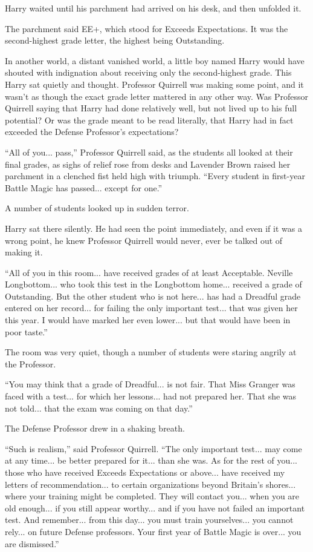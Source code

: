 Harry waited until his parchment had arrived on his desk, and then unfolded it.

The parchment said EE+, which stood for Exceeds Expectations. It was the second-highest grade letter, the highest being Outstanding.

In another world, a distant vanished world, a little boy named Harry would have shouted with indignation about receiving only the second-highest grade. This Harry sat quietly and thought. Professor Quirrell was making some point, and it wasn't as though the exact grade letter mattered in any other way. Was Professor Quirrell saying that Harry had done relatively well, but not lived up to his full potential? Or was the grade meant to be read literally, that Harry had in fact exceeded the Defense Professor's expectations?

``All of you... pass,'' Professor Quirrell said, as the students all looked at their final grades, as sighs of relief rose from desks and Lavender Brown raised her parchment in a clenched fist held high with triumph. ``Every student in first-year Battle Magic has passed... except for one.''

A number of students looked up in sudden terror.

Harry sat there silently. He had seen the point immediately, and even if it was a wrong point, he knew Professor Quirrell would never, ever be talked out of making it.

``All of you in this room... have received grades of at least Acceptable. Neville Longbottom... who took this test in the Longbottom home... received a grade of Outstanding. But the other student who is not here... has had a Dreadful grade entered on her record... for failing the only important test... that was given her this year. I would have marked her even lower... but that would have been in poor taste.''

The room was very quiet, though a number of students were staring angrily at the Professor.

``You may think that a grade of Dreadful... is not fair. That Miss Granger was faced with a test... for which her lessons... had not prepared her. That she was not told... that the exam was coming on that day.''

The Defense Professor drew in a shaking breath.

``Such is realism,'' said Professor Quirrell. ``The only important test... may come at any time... be better prepared for it... than she was. As for the rest of you... those who have received Exceeds Expectations or above... have received my letters of recommendation... to certain organizations beyond Britain's shores... where your training might be completed. They will contact you... when you are old enough... if you still appear worthy... and if you have not failed an important test. And remember... from this day... you must train yourselves... you cannot rely... on future Defense professors. Your first year of Battle Magic is over... you are dismissed.''

